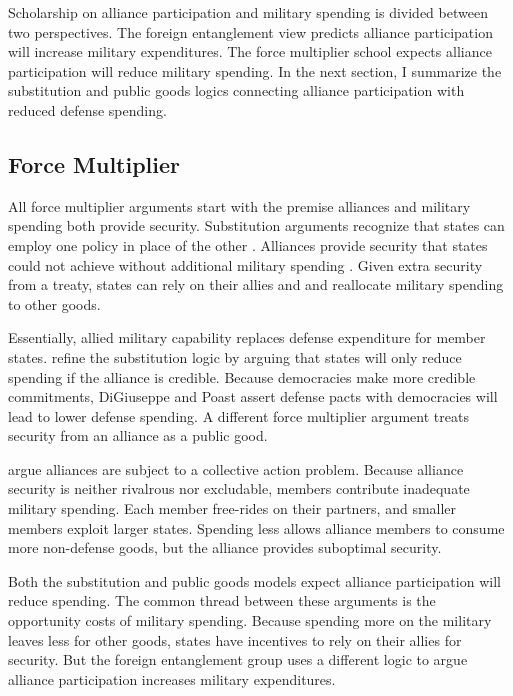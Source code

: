 \documentclass[12pt]{article}
\begin{document}
Scholarship on alliance participation and military spending is divided between two perspectives. 
The foreign entanglement view predicts alliance participation will increase military expenditures.
The force multiplier school expects alliance participation will reduce military spending. 
In the next section, I summarize the substitution and public goods logics connecting alliance participation with reduced defense spending. 


\subsection{Force Multiplier} 


All force multiplier arguments start with the premise alliances and military spending both provide security.
Substitution arguments recognize that states can employ one policy in place of the other \citep{MostStarr1989}.  
Alliances provide security that states could not achieve without additional military spending \citep{Morrow1993, Conybeare1994}. 
Given extra security from a treaty, states can rely on their allies and and reallocate military spending to other goods. 


Essentially, allied military capability replaces defense expenditure for member states. 
\citet{DigiuseppePoast2016} refine the substitution logic by arguing that states will only reduce spending if the alliance is credible. 
Because democracies make more credible commitments, DiGiuseppe and Poast assert defense pacts with democracies will lead to lower defense spending. 
A different force multiplier argument treats security from an alliance as a public good. 


\citet{OlsonZeckhauser1966} argue alliances are subject to a collective action problem.
Because alliance security is neither rivalrous nor excludable, members contribute inadequate military spending. 
Each member free-rides on their partners, and smaller members exploit larger states. 
Spending less allows alliance members to consume more non-defense goods, but the alliance provides suboptimal security. 


Both the substitution and public goods models expect alliance participation will reduce spending. 
The common thread between these arguments is the opportunity costs of military spending. 
Because spending more on the military leaves less for other goods, states have incentives to rely on their allies for security. 
But the foreign entanglement group uses a different logic to argue alliance participation increases military expenditures. 
\end{document}
